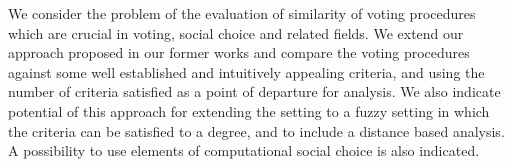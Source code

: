 
We consider the problem of the evaluation of similarity of voting procedures which are crucial in voting, social choice and related fields. We extend our approach 
proposed in our former works and compare the voting procedures against some well established and intuitively appealing 
criteria, and using the number of criteria satisfied as a point of departure for analysis. We also indicate potential of this approach for 
extending the setting to a fuzzy setting in which the criteria can be satisfied to a degree, and to include  a distance based analysis. A possibility to use elements of computational social choice is also indicated.\\[0.5cm]


